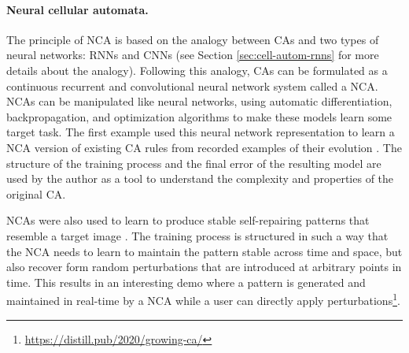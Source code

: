 \paragraph{Neural cellular automata\label{sec:neur-cell-autom}.}
The principle of \ac{NCA} is based on the analogy between \acp{CA} and two types
of neural networks: \acp{RNN} and \acp{CNN} (see Section
\ref{sec:cell-autom-rnns} for more details about the analogy). Following this
analogy, \acp{CA} can be formulated as a continuous recurrent and convolutional
neural network system called a \acf{NCA}. \acp{NCA} can be manipulated like
neural networks, using automatic differentiation, backpropagation, and
optimization algorithms to make these models learn some target task. The first
example used this neural network representation to learn a \ac{NCA} version of
existing \ac{CA} rules from recorded examples of their evolution
\parencite{gilpinCellularAutomataConvolutional2018}. The structure of the
training process and the final error of the resulting model are used by the author as
a tool to understand the complexity and properties of the original \ac{CA}.

\acp{NCA} were also used to learn to produce stable self-repairing patterns that
resemble a target image \parencite{mordvintsevGrowingNeuralCellular2020}. The
training process is structured in such a way that the \ac{NCA} needs to learn to
maintain the pattern stable across time and space, but also recover form random
perturbations that are introduced at arbitrary points in time. This results in
an interesting demo where a pattern is generated and maintained in real-time by
a \ac{NCA} while a user can directly apply
perturbations\footnote{\url{https://distill.pub/2020/growing-ca/}}.

